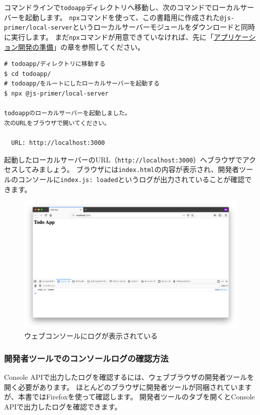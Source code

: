 コマンドラインで\texttt{todoapp}ディレクトリへ移動し、次のコマンドでローカルサーバーを起動します。
\texttt{npx}コマンドを使って、この書籍用に作成された\texttt{@js-primer/local-server}というローカルサーバーモジュールをダウンロードと同時に実行します。
まだ\texttt{npx}コマンドが用意できていなければ、先に「\hyperlink{setup-local-env}{アプリケーション開発の準備}」の章を参照してください。

\begin{lstlisting}
# todoapp/ディレクトリに移動する
$ cd todoapp/
# todoapp/をルートにしたローカルサーバーを起動する
$ npx @js-primer/local-server

todoappのローカルサーバーを起動しました。
次のURLをブラウザで開いてください。

  URL: http://localhost:3000
\end{lstlisting}

起動したローカルサーバーのURL（\texttt{http://localhost:3000}）へブラウザでアクセスしてみましょう。
ブラウザには\texttt{index.html}の内容が表示され、開発者ツールのコンソールに\texttt{index.js: loaded}というログが出力されていることが確認できます。

\begin{figure}[h]
\centering
\includegraphics[width=130mm]{fig/first-entry.png}
\caption{ウェブコンソールにログが表示されている}
\end{figure}

\hypertarget{view-console-log-in-dev-tools}{%
\subsubsection{開発者ツールでのコンソールログの確認方法}\label{view-console-log-in-dev-tools}}

Console
APIで出力したログを確認するには、ウェブブラウザの開発者ツールを開く必要があります。
ほとんどのブラウザに開発者ツールが同梱されていますが、本書ではFirefoxを使って確認します。
開発者ツールの\textbf{}タブを開くとConsole
APIで出力したログを確認できます。

